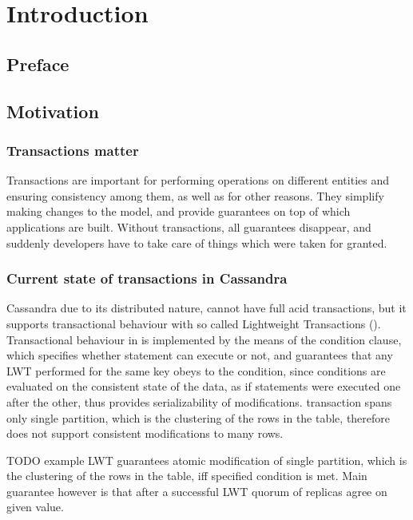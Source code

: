 
\chapter{Introduction}\label{chapter:introduction}

\section{Preface}\label{sec:introduction:preface}

\section{Motivation}\label{sec:introduction:motivation}

\subsection{Transactions matter}

Transactions are important for performing operations on different entities and ensuring consistency among them, as well as for other reasons. They simplify making changes to the model, and provide guarantees on top of which applications are built. Without transactions, all guarantees disappear, and suddenly developers have to take care of things which were taken for granted.

\subsection{Current state of transactions in Cassandra}	
Cassandra due to its distributed nature, cannot have full acid transactions, but it supports transactional behaviour with so called Lightweight Transactions (\lwt).
Transactional behaviour in \lwt is implemented by the means of the condition clause, which specifies whether statement can execute or not, and guarantees that any LWT performed for the same key obeys to the condition, since conditions are evaluated on the consistent state of the data, as if statements were executed one after the other, thus provides serializability of modifications. \lwt transaction spans only single partition, which is the clustering of the rows in the table, therefore \lwt does not support consistent modifications to many rows.


TODO example
LWT guarantees atomic modification of single partition, which is the clustering of the rows in the table, iff specified condition is met. Main guarantee however is that after a successful LWT quorum of replicas agree on given value.


